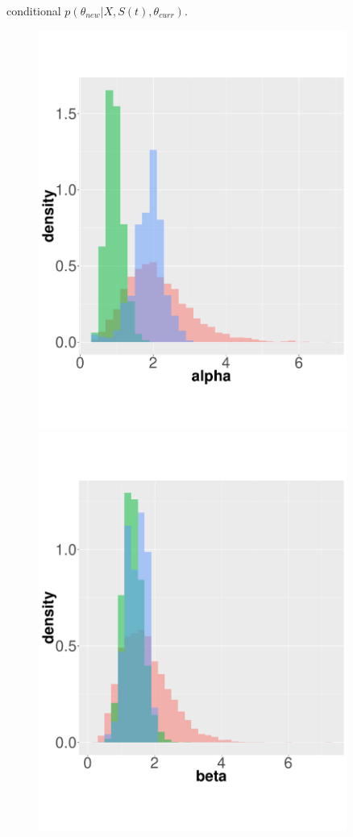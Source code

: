 conditional $p(\theta_{new}|X,S(t),\theta_{curr})$. 
  \begin{figure}%
  \begin{minipage}[hp]{0.4\linewidth}
  \centering
    \includegraphics [width=0.90\textwidth, angle=0]{figs/hist_alpha.pdf}
    \vspace{-0 in}
  \end{minipage}
  \begin{minipage}[!hp]{0.4\linewidth}
  \centering
    \includegraphics [width=0.90\textwidth, angle=0]{figs/hist_beta.pdf}

\end{minipage}
\end{figure}
